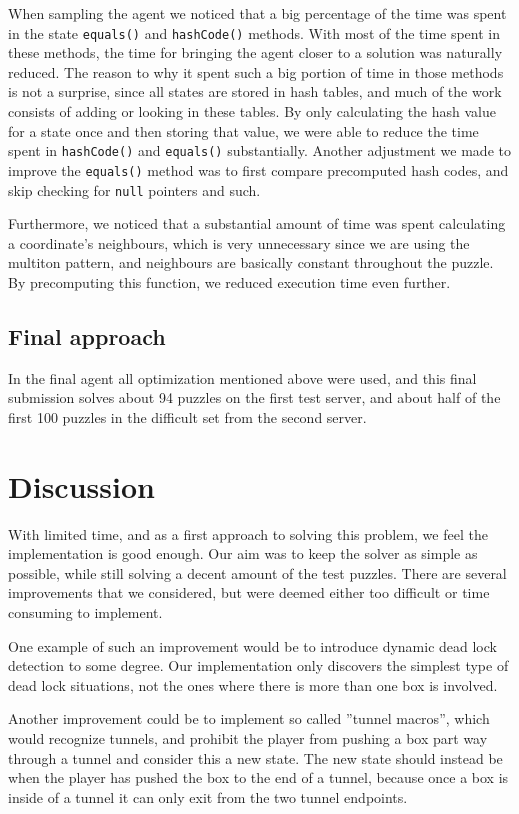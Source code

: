\documentclass[a4paper,11pt]{article}
\begin{document}
When sampling the agent we noticed that a big percentage of the time was spent in the state \verb!equals()! and \verb!hashCode()! methods. 
With most of the time spent in these methods, the time for bringing the agent closer to a solution
was naturally reduced.
The reason to why it spent such a big portion of time in those methods is not a surprise,
since all states are stored in hash tables, and much of the work consists of
adding or looking in these tables.
By only calculating the hash value for a state once and then storing that value,
we were able to reduce the time spent in \verb!hashCode()! and \verb!equals()! substantially.
Another adjustment we made to improve the \verb!equals()! method was to first compare precomputed hash codes,
and skip checking for \verb!null! pointers and such.

Furthermore, we noticed that a substantial amount of time was spent calculating
a coordinate's neighbours, which is very unnecessary since
we are using the multiton pattern, and neighbours are basically constant throughout the puzzle.
By precomputing this function, we reduced execution time even further.

\subsection{Final approach}
In the final agent all optimization mentioned above were used,
and this final submission solves about 94 puzzles on the first test server,
and about half of the first 100 puzzles in the difficult set from the second server.

\section{Discussion}

With limited time, and as a first approach to solving this problem,
we feel the implementation is good enough.
Our aim was to keep the solver as simple as possible,
while still solving a decent amount of the test puzzles.
There are several improvements that we considered, but were
deemed either too difficult or time consuming to implement.

One example of such an improvement would be to introduce dynamic
dead lock detection to some degree.
Our implementation only discovers the simplest type of dead lock situations,
not the ones where there is more than one box is involved.

Another improvement could be to implement so called ''tunnel macros'',
which would recognize tunnels, and prohibit the player
from pushing a box part way through a tunnel and consider this a new state.
The new state should instead be when the player has pushed the box to the end of a tunnel,
because once a box is inside of a tunnel it can only exit from the two tunnel endpoints.
\end{document}
